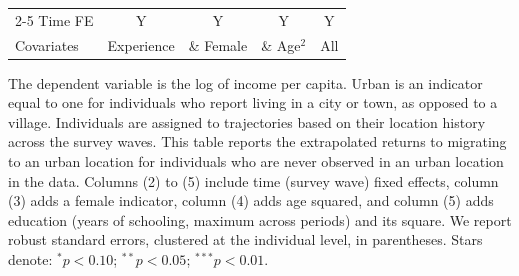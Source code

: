 \begin{table}[htbp]
\begin{threeparttable}
\begin{tabular}{l cccc}
\cmidrule{2-5} Time FE & Y & Y & Y & Y \\ Covariates & Experience & \& Female & \& Age$^2$ & All \\ \bottomrule \end{tabular} \begin{tablenotes}[flushleft] \footnotesize \item{The dependent variable is the log of income per capita. Urban is an indicator equal to one for individuals who report living in a city or town, as opposed to a village. Individuals are assigned to trajectories based on their location history across the survey waves. This table reports the extrapolated returns to migrating to an urban location for individuals who are never observed in an urban location in the data. Columns (2) to (5) include time (survey wave) fixed effects, column (3) adds a female indicator, column (4) adds age squared, and column (5) adds education (years of schooling, maximum across periods) and its square. We report robust standard errors, clustered at the individual level, in parentheses. Stars denote: $^{*} p<0.10$; $^{**} p<0.05$; $^{***} p<0.01$.} \end{tablenotes} \end{threeparttable} \end{table}
